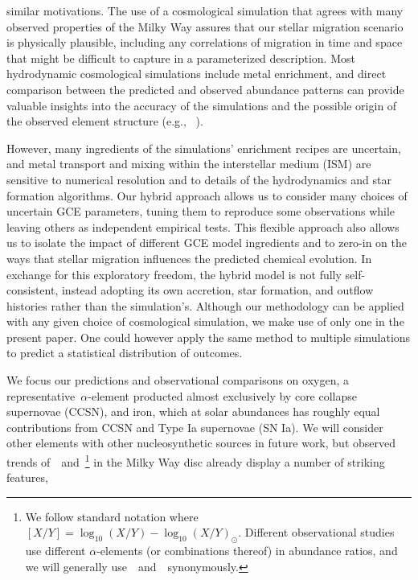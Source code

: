 \documentclass[draft2.tex]{subfiles}
\begin{document}
similar motivations. 
The use of a cosmological simulation that agrees with many observed properties 
of the Milky Way assures that our stellar migration scenario is physically 
plausible, including any correlations of migration in time and space that might 
be difficult to capture in a parameterized description. 
Most hydrodynamic cosmological simulations include metal enrichment, and direct 
comparison between the predicted and observed abundance patterns can provide 
valuable insights into the accuracy of the simulations and the possible origin 
of the observed element structure (e.g., ~\citealt{Mackereth2017, Grand2018, 
Buck2020b, Vincenzo2020, Buck2021}). 
\par 
However, many ingredients of the simulations' enrichment recipes are 
uncertain, and metal transport and mixing within the interstellar medium (ISM) 
are sensitive to numerical resolution and to details of the hydrodynamics and 
star formation algorithms. 
Our hybrid approach allows us to consider many 
choices of uncertain GCE parameters, tuning them to reproduce some 
observations while leaving others as independent empirical tests. 
This flexible approach also allows us to isolate the impact of different 
GCE model ingredients and to zero-in on the ways that stellar migration 
influences the predicted chemical evolution. 
In exchange for this exploratory freedom, the hybrid model is not fully 
self-consistent, instead adopting its own accretion, star formation, and 
outflow histories rather than the simulation's. Although our methodology can 
be applied with any given choice of cosmological simulation, we make use of 
only one in the present paper. 
One could however apply the same method to multiple simulations to 
predict a statistical distribution of outcomes. 
\par 
We focus our predictions and observational comparisons on oxygen, a 
representative~$\alpha$-element producted almost exclusively by core 
collapse supernovae (CCSN), and iron, which at solar abundances has roughly 
equal contributions from CCSN and Type Ia supernovae (SN Ia). We will consider 
other elements with other nucleosynthetic sources in future work, but 
observed trends of~\feh~and~\afe\footnote{
	We follow standard notation where $[X/Y] = \log_{10}(X/Y) - 
	\log_{10}(X/Y)_\odot$. Different observational studies use different 
	$\alpha$-elements (or combinations thereof) in abundance ratios, and we 
	will generally use~\ofe~and~\afe~synonymously. 
} in the Milky Way disc already display a number of striking features, 
\end{document}
